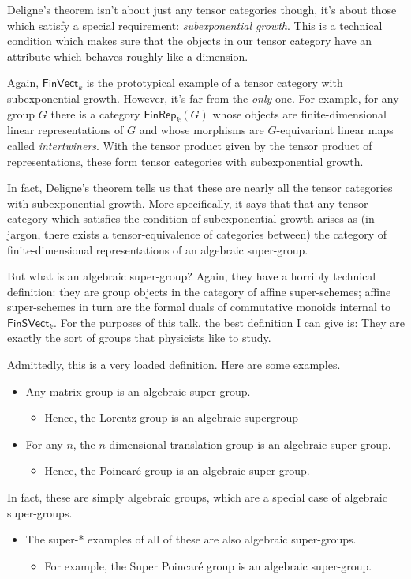 \documentclass[a4paper,10pt]{scrreprt}
\theoremstyle{definition}
\theoremstyle{plain}
\theoremstyle{remark}
\begin{document}
Deligne's theorem isn't about just any tensor categories though, it's about those which satisfy a special requirement: \emph{subexponential growth}. This is a technical condition which makes sure that the objects in our tensor category have an attribute which behaves roughly like a dimension.

Again, $\mathsf{FinVect}_{k}$ is the prototypical example of a tensor category with subexponential growth. However, it's far from the \emph{only} one. For example, for any group $G$ there is a category $\mathsf{FinRep}_{k}(G)$ whose objects are finite-dimensional linear representations of $G$ and whose morphisms are $G$-equivariant linear maps called \emph{intertwiners}. With the tensor product given by the tensor product of representations, these form tensor categories with subexponential growth.

In fact, Deligne's theorem tells us that these are nearly all the tensor categories with subexponential growth. More specifically, it says that that any tensor category which satisfies the condition of subexponential growth arises as (in jargon, there exists a tensor-equivalence of categories between) the category of finite-dimensional representations of an algebraic super-group.

But what is an algebraic super-group? Again, they have a horribly technical definition: they are group objects in the category of affine super-schemes; affine super-schemes in turn are the formal duals of commutative monoids internal to $\mathsf{FinSVect}_{k}$. For the purposes of this talk, the best definition I can give is: They are exactly the sort of groups that physicists like to study. 

Admittedly, this is a very loaded definition. Here are some examples. 
\begin{itemize}
  \item Any matrix group is an algebraic super-group.
    \begin{itemize}
      \item Hence, the Lorentz group is an algebraic supergroup
    \end{itemize}

  \item For any $n$, the $n$-dimensional translation group is an algebraic super-group.
    \begin{itemize}
      \item Hence, the Poincar\'{e} group is an algebraic super-group.
    \end{itemize}
\end{itemize}
In fact, these are simply algebraic groups, which are a special case of algebraic super-groups. 
\begin{itemize}
  \item The super-* examples of all of these are also algebraic super-groups.
    \begin{itemize}
      \item For example, the Super Poincar\'{e} group is an algebraic super-group.
    \end{itemize}
\end{itemize}
\end{document}
